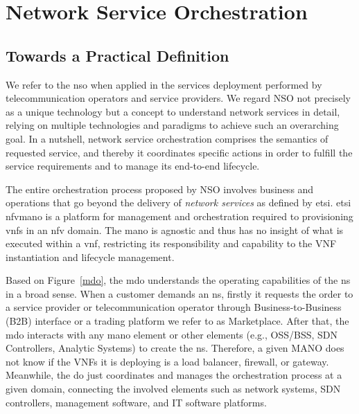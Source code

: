 \section{Network Service Orchestration}
\label{sec:nso}

\subsection{Towards a Practical Definition}
\label{sec:def}

We refer to the \acrfull{nso} when applied in the services deployment performed by telecommunication operators and service providers. We regard NSO not precisely as a unique technology but a concept to  understand network services in detail, relying on multiple technologies and paradigms to achieve such an overarching goal. In a nutshell, network service orchestration comprises the semantics of requested service, and thereby it coordinates specific actions in order to fulfill the service requirements and to manage its end-to-end lifecycle. 

The entire orchestration process proposed by NSO involves business and operations that go beyond the delivery of \textit{network services} as defined by \gls{etsi}. \gls{etsi} \gls{nfvmano} is a platform for management and orchestration required to provisioning \glspl{vnf} in an \gls{nfv} domain. The \gls{mano} is agnostic and thus has no insight of what is executed within a \gls{vnf}, restricting its responsibility and capability to the VNF instantiation and lifecycle management.

Based on Figure~\ref{mdo}, the \gls{mdo} understands the operating capabilities of the \gls{ns} in a broad sense. When a customer demands an \gls{ns}, firstly it requests the order to a service provider or telecommunication operator through Business-to-Business (B2B) interface or a trading platform we refer to as Marketplace. After that, the \gls{mdo} interacts with any \gls{mano} element or other elements (e.g., OSS/BSS, SDN Controllers, Analytic Systems)  to create the \gls{ns}. Therefore, a given MANO does not know if the VNFs it is deploying is a load balancer, firewall, or gateway. Meanwhile, the \gls{do} just coordinates and manages the orchestration process at a given domain, connecting the involved elements such as network systems, SDN controllers, management software, and IT software platforms.


